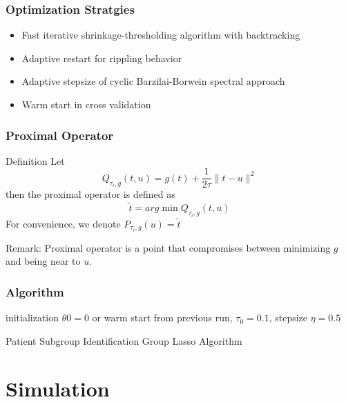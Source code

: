 \documentclass{beamer}
\begin{document}
\begin{frame}
\frametitle{Optimization Stratgies}
\begin{itemize}
\item Fast iterative shrinkage-thresholding algorithm with backtracking\cite{fasta}
\item Adaptive restart for rippling behavior \cite{restart}
\item Adaptive stepsize of cyclic Barzilai-Borwein spectral approach\cite{step}
\item Warm start in cross validation
\end{itemize}

\end{frame}


\begin{frame}
\frametitle{Proximal Operator}
\begin{block}{Definition}
Let $$Q_{\tau_i,g}(t,u)=g(t)+\frac{1}{2\tau}\parallel t-u\parallel^2$$
then the proximal operator is defined as $$\tilde{t}=arg\min Q_{\tau_i,g}(t,u)$$
For convenience, we denote $P_{\tau_i,g}(u)=\tilde{t}$
\end{block}
Remark: Proximal operator is a point that compromises between minimizing $g$ and being near to $u$. 
\end{frame}

\begin{frame}
\frametitle{Algorithm}
\begin{algorithm}[H]
 initialization $\theta0=0$ or warm start from previous run, $\tau_0=0.1$, stepsize $\eta=0.5$\;
 \caption{Patient Subgroup Identification Group Lasso Algorithm}
\end{algorithm}


\end{frame}


\section{Simulation}
\end{document}
